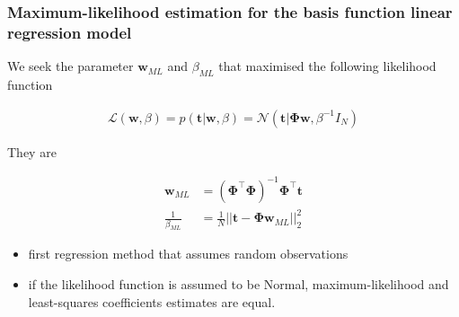 \begin{frame}
    \frametitle{Maximum-likelihood estimation for the basis function linear
    regression model}

    \footnotesize
    We seek the parameter $\mathbf{w}_{ML}$ and $\beta_{ML}$ that maximised the following likelihood function

    \begin{align}
        \mathcal{L}(\mathbf{w},\beta)=p(\mathbf{t}|\mathbf{w},\beta)=\mathcal{N}(\mathbf{t}|\boldsymbol{\Phi}\mathbf{w},\beta^{-1}I_N)\label{eq:likelihoodLinearRegression}
    \end{align}

    They are

    \begin{align}
        \mathbf{w}_{ML}&=(\boldsymbol{\Phi}^\intercal\boldsymbol{\Phi})^{-1}\boldsymbol{\Phi}^\intercal\mathbf{t}\label{eq:wML}\\
        \frac{1}{\beta_{ML}}&=\frac{1}{N}||\mathbf{t}-\boldsymbol{\Phi}\mathbf{w}_{ML}||_2^2\label{eq:betaML}
    \end{align}

	\begin{itemize}

		\item first regression method that assumes random observations

		\item if the likelihood function is assumed to be Normal,
		maximum-likelihood and least-squares coefficients estimates are equal.

	\end{itemize}

    \normalsize

\end{frame}

